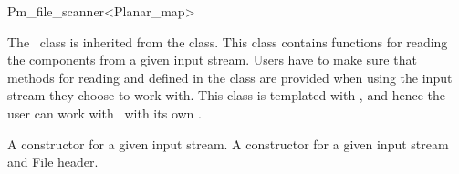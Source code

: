 
\ccRefPageBegin

\renewcommand{\ccRefPageBegin}{\begin{ccAdvanced}}
\renewcommand{\ccRefPageEnd}{\end{ccAdvanced}}

\begin{ccRefClass}{Pm_file_scanner<Planar_map>}


\ccDefinition
The \ccRefName\ class is inherited from the  class. 
This class contains functions for reading the  components from a given input stream. 
Users have to make sure that methods for reading  and  defined in  
the  class are provided when using the input stream they choose to work with.
This class is templated with , and hence the user can work with \ccRefName\ with its own . 
 

\ccTypes




\ccCreation
    
{A constructor for a given input stream.}
{A constructor for a given input stream and File header.}


\end{ccRefClass}
